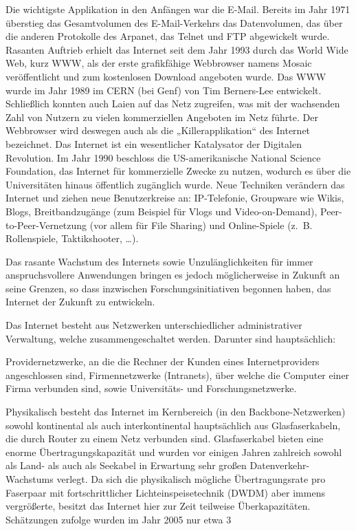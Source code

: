 Die wichtigste Applikation in den Anfängen war die E-Mail. Bereits im Jahr 1971 überstieg das Gesamtvolumen des E-Mail-Verkehrs das Datenvolumen, das über die anderen Protokolle des Arpanet, das Telnet und FTP abgewickelt wurde.
Rasanten Auftrieb erhielt das Internet seit dem Jahr 1993 durch das World Wide Web, kurz WWW, als der erste grafikfähige Webbrowser namens Mosaic veröffentlicht und zum kostenlosen Download angeboten wurde. 
Das WWW wurde im Jahr 1989 im CERN (bei Genf) von Tim Berners-Lee entwickelt. Schließlich konnten auch Laien auf das Netz zugreifen, was mit der wachsenden Zahl von Nutzern zu vielen kommerziellen Angeboten im Netz führte.
Der Webbrowser wird deswegen auch als die „Killerapplikation“ des Internet bezeichnet. Das Internet ist ein wesentlicher Katalysator der Digitalen Revolution.
Im Jahr 1990 beschloss die US-amerikanische National Science Foundation, das Internet für kommerzielle Zwecke zu nutzen, wodurch es über die Universitäten hinaus öffentlich zugänglich wurde.
Neue Techniken verändern das Internet und ziehen neue Benutzerkreise an: IP-Telefonie, Groupware wie Wikis, Blogs, Breitbandzugänge (zum Beispiel für Vlogs und Video-on-Demand), Peer-to-Peer-Vernetzung (vor allem für File Sharing) und Online-Spiele (z. B. Rollenspiele, Taktikshooter, …).

Das rasante Wachstum des Internets sowie Unzulänglichkeiten für immer anspruchsvollere Anwendungen bringen es jedoch möglicherweise in Zukunft an seine Grenzen, so dass inzwischen Forschungsinitiativen begonnen haben, das Internet der Zukunft zu entwickeln.

Das Internet besteht aus Netzwerken unterschiedlicher administrativer Verwaltung, welche zusammengeschaltet werden. Darunter sind hauptsächlich:

Providernetzwerke, an die die Rechner der Kunden eines Internetproviders angeschlossen sind,
Firmennetzwerke (Intranets), über welche die Computer einer Firma verbunden sind, sowie
Universitäts- und Forschungsnetzwerke.

Physikalisch besteht das Internet im Kernbereich (in den Backbone-Netzwerken) sowohl kontinental als auch interkontinental hauptsächlich aus Glasfaserkabeln, die durch Router zu einem Netz verbunden sind. 
Glasfaserkabel bieten eine enorme Übertragungskapazität und wurden vor einigen Jahren zahlreich sowohl als Land- als auch als Seekabel in Erwartung sehr großen Datenverkehr-Wachstums verlegt. Da sich die physikalisch mögliche Übertragungsrate pro Faserpaar mit fortschrittlicher Lichteinspeisetechnik (DWDM) aber immens vergrößerte, besitzt das Internet hier zur Zeit teilweise Überkapazitäten. Schätzungen zufolge wurden im Jahr 2005 nur etwa 3 %

